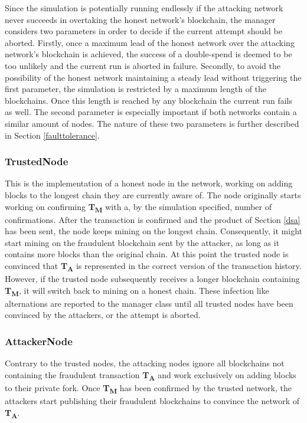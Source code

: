 \documentclass[a4paper,12pt,twoside]{report}
\begin{document}
Since the simulation is potentially running endlessly if the attacking network never succeeds in overtaking the honest network's blockchain, the manager considers two parameters in order to decide if the current attempt should be aborted. Firstly, once a maximum lead of the honest network over the attacking network's blockchain is achieved, the success of a double-spend is deemed to be too unlikely and the current run is aborted in failure. Secondly, to avoid the possibility of the honest network maintaining a steady lead without triggering the first parameter, the simulation is restricted by a maximum length of the blockchains. Once this length is reached by any blockchain the current run fails as well. The second parameter is especially important if both networks contain a similar amount of nodes. The nature of these two parameters is further described in Section \ref{faulttolerance}.
\subsubsection{TrustedNode}
This is the implementation of a honest node in the network, working on adding blocks to the longest chain they are currently aware of. The node originally starts working on confirming \textbf{T\textsubscript{M}} with a, by the simulation specified, number of confirmations. After the transaction is confirmed and the product of Section \ref{dsa} has been sent, the node keeps mining on the longest chain. Consequently, it might start mining on the fraudulent blockchain sent by the attacker, as long as it contains more blocks than the original chain. At this point the trusted node is convinced that \textbf{T\textsubscript{A}} is represented in the correct version of the transaction history. However, if the trusted node subsequently receives a longer blockchain containing \textbf{T\textsubscript{M}}, it will switch back to mining on a honest chain. These infection like alternations are reported to the manager class until all trusted nodes have been convinced by the attackers, or the attempt is aborted.
\subsubsection{AttackerNode}
Contrary to the trusted nodes, the attacking nodes ignore all blockchains not containing the fraudulent transaction \textbf{T\textsubscript{A}} and work exclusively on adding blocks to their private fork. Once \textbf{T\textsubscript{M}} has been confirmed by the trusted network, the attackers start publishing their fraudulent blockchains to convince the network of \textbf{T\textsubscript{A}}.
\end{document}
